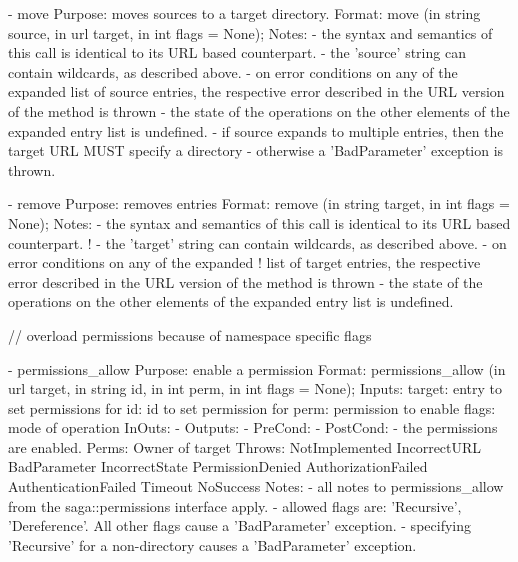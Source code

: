 \begin{myspec}
    - move
      Purpose:  moves sources to a target directory.
      Format:   move               (in  string     source,
                                    in  url        target,
                                    in  int        flags = None);
      Notes:    - the syntax and semantics of this call is 
                  identical to its URL based counterpart.  
                - the 'source' string can contain wildcards, as
                  described above.
                - on error conditions on any of the expanded 
                  list of source entries, the respective error 
                  described in the URL version of the method is 
                  thrown - the state of the operations on the 
                  other elements of the expanded entry list is 
                  undefined.
                - if source expands to multiple entries, then the
                  target URL MUST specify a directory -
                  otherwise a 'BadParameter' exception is thrown.
 
    - remove
      Purpose:  removes entries
      Format:   remove             (in  string  target,
                                    in  int     flags = None);
      Notes:    - the syntax and semantics of this call is 
                  identical to its URL based counterpart.  
!               - the 'target' string can contain wildcards, as
                  described above.
                - on error conditions on any of the expanded 
!                 list of target entries, the respective error 
                  described in the URL version of the method is 
                  thrown - the state of the operations on the 
                  other elements of the expanded entry list is 
                  undefined.
 
 
    // overload permissions because of namespace specific flags
 
    - permissions_allow
      Purpose:  enable a permission 
      Format:   permissions_allow    (in  url       target, 
                                      in  string    id,
                                      in  int       perm, 
                                      in  int       flags = None);
      Inputs:   target:               entry to set permissions for
                id:                   id to set permission for
                perm:                 permission to enable
                flags:                mode of operation
      InOuts:   -
      Outputs:  -
      PreCond:  -
      PostCond: - the permissions are enabled.
      Perms:    Owner of target
      Throws:   NotImplemented
                IncorrectURL
                BadParameter
                IncorrectState
                PermissionDenied
                AuthorizationFailed
                AuthenticationFailed
                Timeout
                NoSuccess
      Notes:    - all notes to permissions_allow from the
                  saga::permissions interface apply.
                - allowed flags are: 'Recursive', 'Dereference'.
                  All other flags cause a 'BadParameter'
                  exception.
                - specifying 'Recursive' for a non-directory
                  causes a 'BadParameter' exception.
 

\end{myspec}
